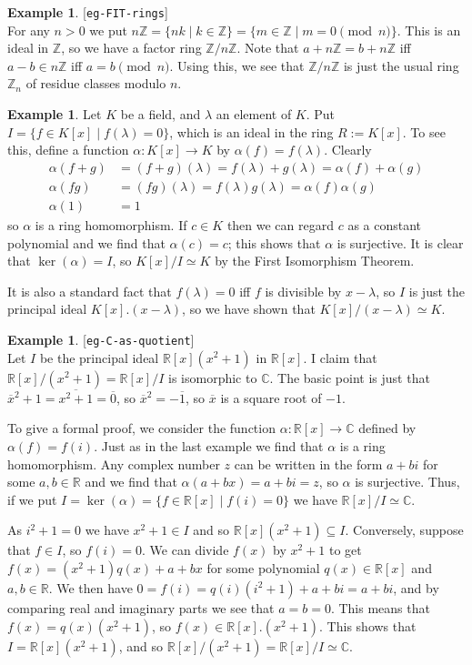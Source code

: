 \documentclass{amsart}
\newcommand{\lbl}[1]{\label{#1}\textup{[\texttt{#1}]}\ \\}
\newcommand{\lbl}{\label}
\newcommand{\C}         {{\mathbb{C}}}
\newcommand{\R}         {{\mathbb{R}}}
\newcommand{\Z}         {{\mathbb{Z}}}
\newcommand{\al}        {\alpha}
\newcommand{\lm}        {\lambda}
\newcommand{\ov}[1]     {\overline{#1}}
\newcommand{\sse}       {\subseteq}
\newcommand{\xra}       {\xrightarrow}
\newcommand{\st}        {\;|\;}
\renewcommand{\:}{\colon}
\theoremstyle{definition}
\newtheorem{example}[theorem]{Example}
\begin{document}
\begin{example}\lbl{eg-FIT-rings}
 For any $n>0$ we put
 $n\Z=\{nk\st k\in\Z\}=\{m\in\Z\st m=0\pmod{n}\}$.  This is an ideal
 in $\Z$, so we have a factor ring $\Z/n\Z$.  Note that $a+n\Z=b+n\Z$
 iff $a-b\in n\Z$ iff $a=b\pmod{n}$.  Using this, we see that $\Z/n\Z$
 is just the usual ring $\Z_n$ of residue classes modulo $n$.
\end{example}
\begin{example}
 Let $K$ be a field, and $\lm$ an element of $K$.  Put
 $I=\{f\in K[x]\st f(\lm)=0\}$, which is an 
 ideal in the ring $R:=K[x]$.  To see this, define a function
 $\al\:K[x]\xra{}K$ by $\al(f)=f(\lm)$.  Clearly
 \begin{align*}
  \al(f+g) &= (f+g)(\lm)=f(\lm) + g(\lm) = \al(f) + \al(g) \\
  \al(fg) &= (fg)(\lm)=f(\lm) g(\lm) = \al(f) \al(g) \\
  \al(1) &= 1
 \end{align*}
 so $\al$ is a ring homomorphism.  If $c\in K$ then we can regard $c$
 as a constant polynomial and we find that $\al(c)=c$; this shows that
 $\al$ is surjective.  It is clear that $\ker(\al)=I$, so
 $K[x]/I\simeq K$ by the First Isomorphism Theorem.

 It is also a standard fact that $f(\lm)=0$ iff $f$ is divisible by
 $x-\lm$, so $I$ is just the principal ideal $K[x].(x-\lm)$, so we
 have shown that $K[x]/(x-\lm)\simeq K$.
\end{example}
\begin{example}\lbl{eg-C-as-quotient}
 Let $I$ be the principal ideal $\R[x](x^2+1)$ in $\R[x]$.  I claim
 that $\R[x]/(x^2+1)=\R[x]/I$ is isomorphic to $\C$.  The basic point
 is just that $\ov{x}^2+1=\ov{x^2+1}=\ov{0}$, so $\ov{x}^2=-\ov{1}$, so
 $\ov{x}$ is a square root of $-1$.

 To give a formal proof, we consider the function $\al\:\R[x]\xra{}\C$
 defined by $\al(f)=f(i)$.  Just as in the last example we find that
 $\al$ is a ring homomorphism.  Any complex number $z$ can be written
 in the form $a+bi$ for some $a,b\in\R$ and we find that
 $\al(a+bx)=a+bi=z$, so $\al$ is surjective.  Thus, if we put
 $I=\ker(\al)=\{f\in\R[x]\st f(i)=0\}$ we have $\R[x]/I\simeq\C$.

 As $i^2+1=0$ we have $x^2+1\in I$ and so $\R[x](x^2+1)\sse I$.
 Conversely, suppose that $f\in I$, so $f(i)=0$.  We can divide $f(x)$
 by $x^2+1$ to get $f(x)=(x^2+1)q(x)+a+bx$ for some polynomial
 $q(x)\in\R[x]$ and $a,b\in\R$.  We then have
 $0=f(i)=q(i)(i^2+1)+a+bi=a+bi$, and by comparing real and imaginary
 parts we see that $a=b=0$.  This means that $f(x)=q(x)(x^2+1)$, so
 $f(x)\in\R[x].(x^2+1)$.  This shows that $I=\R[x](x^2+1)$, and so
 $\R[x]/(x^2+1)=\R[x]/I\simeq\C$.
\end{example}
\end{document}
